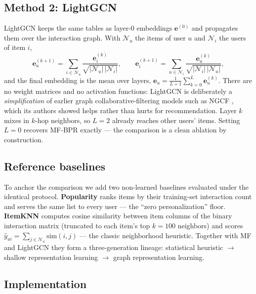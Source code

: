 \documentclass[11pt]{article}
\begin{document}
\subsection{Method 2: LightGCN}

LightGCN keeps the same tables as layer-0 embeddings
$\mathbf{e}^{(0)}$ and propagates them over the interaction graph. With
$\mathcal{N}_u$ the items of user $u$ and $\mathcal{N}_i$ the users of item
$i$,
\begin{equation}
\mathbf{e}_u^{(k+1)}=\sum_{i\in\mathcal{N}_u}
\frac{\mathbf{e}_i^{(k)}}{\sqrt{|\mathcal{N}_u|\,|\mathcal{N}_i|}},
\qquad
\mathbf{e}_i^{(k+1)}=\sum_{u\in\mathcal{N}_i}
\frac{\mathbf{e}_u^{(k)}}{\sqrt{|\mathcal{N}_i|\,|\mathcal{N}_u|}},
\end{equation}
and the final embedding is the mean over layers,
$\mathbf{e}_u=\frac{1}{L+1}\sum_{k=0}^{L}\mathbf{e}_u^{(k)}$. There are no
weight matrices and no activation functions: LightGCN is deliberately a
\emph{simplification} of earlier graph collaborative-filtering models such
as NGCF \cite{ngcf}, which its authors showed helps rather
than hurts for recommendation. Layer $k$ mixes in $k$-hop neighbors, so
$L{=}2$ already reaches other users' items. Setting $L{=}0$ recovers MF-BPR
exactly --- the comparison is a clean ablation by construction.

\subsection{Reference baselines}

To anchor the comparison we add two non-learned baselines evaluated under the
identical protocol. \textbf{Popularity} ranks items by their training-set
interaction count and serves the same list to every user --- the ``zero
personalization'' floor. \textbf{ItemKNN} computes cosine similarity between
item columns of the binary interaction matrix (truncated to each item's top
$k{=}100$ neighbors) and scores
$\hat y_{ui}=\sum_{j \in \mathcal{N}_u}\mathrm{sim}(i,j)$ --- the classic
neighborhood heuristic. Together with MF and LightGCN they form a
three-generation lineage: statistical heuristic $\rightarrow$ shallow
representation learning $\rightarrow$ graph representation learning.

\subsection{Implementation}
\end{document}
